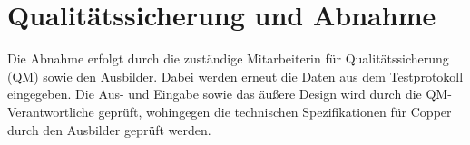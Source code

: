\section{Qualitätssicherung und Abnahme} 
\label{sec:QualitätssicherungAbnahme}
Die Abnahme erfolgt durch die zuständige Mitarbeiterin für Qualitätssicherung (QM) sowie den Ausbilder. Dabei werden erneut die Daten aus dem Testprotokoll eingegeben. Die Aus- und Eingabe sowie das äußere Design wird durch die QM-Verantwortliche geprüft, wohingegen die technischen Spezifikationen für Copper durch den Ausbilder geprüft werden.

